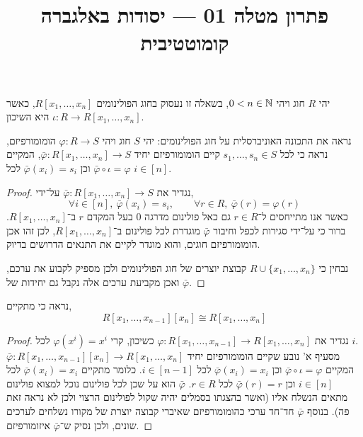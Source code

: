
\title{פתרון מטלה 01 --- יסודות באלגברה קומוטטיבית}


\maketitle
\maketitleprint[red]

\question{}
יהי $R$ חוג ויהי $0 < n \in \mathbb{N}$, בשאלה זו נעסוק בחוג הפולינומים $R[x_1, \ldots, x_n]$, כאשר $\iota : R \to R[x_1, \ldots, x_n]$ היא השיכון.

\subquestion{}
נראה את התכונה האוניברסלית על חוג הפולינומים:
יהי $S$ חוג ויהי $\varphi : R \to S$ הומומורפיזם, נראה כי לכל $s_1, \ldots, s_n \in S$ קיים הומומורפיזם יחיד $\bar{\varphi} : R[x_1, \ldots, x_n] \to S$,
המקיים $\bar{\varphi} \circ \iota = \varphi$ וכן $\bar{\varphi}(x_i) = s_i$ לכל $i \in [n]$.
\begin{proof}
	נגדיר את $\bar{\varphi} : R[x_1, \ldots, x_n] \to S$ על־ידי,
	\[
		\forall i \in [n],\ \bar{\varphi}(x_i) = s_i,
		\qquad
		\forall r \in R,\ \bar{\varphi}(r) = \varphi(r)
	\]
	כאשר אנו מתייחסים ל־$r \in R$ גם כאל פולינום מדרגה $0$ בעל המקדם $r$ ב־$R[x_1, \ldots, x_n]$.
	ברור כי על־ידי סגירות לכפל וחיבור $\bar{\varphi}$ מוגדרת לכל פולינום ב־$R[x_1, \ldots, x_n]$, לכן זהו אכן הומומורפיזם חוגים, והוא מוגדר לקיים את התנאים הדרושים בדיוק.

	נבחין כי $R \cup \{ x_1, \ldots, x_n \}$ קבוצת יוצרים של חוג הפולינומים ולכן מספיק לקבוע את ערכם, ואכן מקביעת ערכים אלה נקבל גם יחידות של $\bar{\varphi}$.
\end{proof}

\subquestion{}
נראה כי מתקיים,
\[
	R[x_1, \ldots, x_{n - 1}][x_n]
	\cong R[x_1, \ldots, x_n]
\]
\begin{proof}
	נגדיר את $\varphi : R[x_1, \ldots, x_{n - 1}] \to R[x_1, \ldots, x_n]$ כשיכון, קרי $\varphi(x^i) = x^i$ לכל $i$. \\
	מסעיף א' נובע שקיים הומומורפיזם יחיד $\bar{\varphi} : R[x_1, \ldots, x_{n - 1}][x_n] \to R[x_1, \ldots, x_n]$ המקיים $\bar{\varphi} \circ \iota = \varphi$ וכן $\bar{\varphi}(x_i) = x_i$ לכל $i \in [n - 1]$.
	כלומר מתקיים $\bar{\varphi}(x_i) = x_i$ לכל $i \in [n]$ וכן $\bar{\varphi}(r) = r$ לכל $r \in R$.
	$\bar{\varphi}$ הוא על שכן לכל פולינום נוכל למצוא פולינום מתאים הנשלח אליו (ואשר בהצגתו בסמלים יהיה שקול לפולינום הרצוי ולכן לא נראה זאת פה).
	בנוסף $\bar{\varphi}$ חד־חד ערכי כהומומורפיזם שאיברי קבוצה יוצרת של מקורו נשלחים לערכים שונים, ולכן נסיק ש־$\bar{\varphi}$ איזומורפיזם.
\end{proof}


